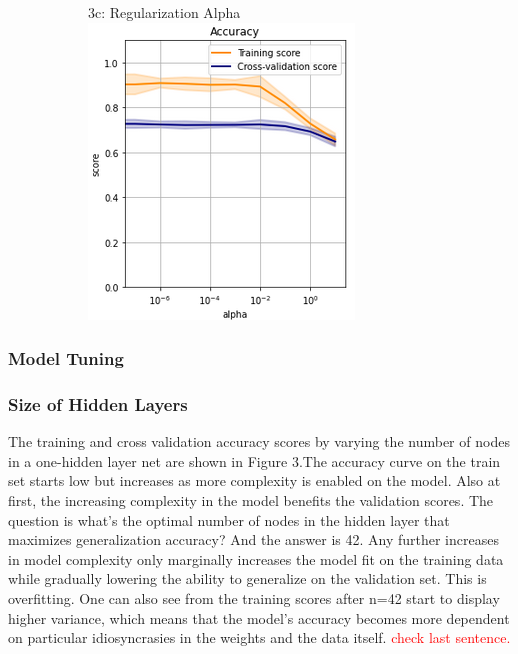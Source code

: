 \documentclass{article}
\newcommand\todo[1]{\textcolor{red}{#1}}
\begin{document}
\begin{figure}
\begin{subfigure}{.3\textwidth}
	\end{subfigure}
	\begin{subfigure}{.3\textwidth}
		\centering
		3c: Regularization Alpha\\
		\includegraphics[width=\linewidth]{poland_nn_alpha_0_10_accuracy.png}
		
	\end{subfigure}
	\label{fig:test}
\end{figure}

\subsubsection*{Model Tuning}

\subsubsection*{Size of Hidden Layers}
The training and cross validation accuracy scores by varying the number of nodes in a one-hidden layer net are shown in Figure 3.The accuracy curve on the train set starts low but increases as more complexity is enabled on the model. Also at first, the increasing complexity in the model benefits the validation scores. The question is what's the optimal number of nodes in the hidden layer that maximizes generalization accuracy? And the answer is 42. Any further increases in model complexity only marginally increases the model fit on the training data while gradually lowering the ability to generalize on the validation set. This is overfitting. One can also see from the training scores after n=42 start to display higher variance, which means that the model's accuracy becomes more dependent on particular idiosyncrasies in the weights and the data itself. \todo{check last sentence.}
\end{document}
